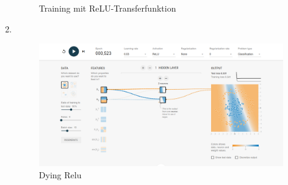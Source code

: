 \documentclass[DIN, pagenumber=false, fontsize=11pt, parskip=half]{scrartcl}
\begin{document}
\begin{enumerate}[label=\alph*)]
\begin{figure}[H]
                \caption{Training mit ReLU-Transferfunktion}
            \end{figure}
        \item $ $
            \begin{figure}[H]
                \centering
                \includegraphics[width=\textwidth]{dying_relu.png}
                \caption{Dying Relu}
            \end{figure}
    \end{enumerate}
\end{document}
